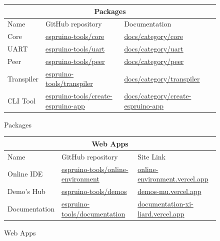 \documentclass{l4proj}
\begin{document}
\begin{figure}[!ht]
    
\begin{center}
\begin{tabular}{|p{2.25cm}|p{5.25cm}|p{5.25cm}|}
 \hline
 \multicolumn{3}{|c|}{Packages} \\
 \hline
 Name  & GitHub repository& Documentation\\
 \hline
Core & \href{https://github.com/espruino-tools/core}{espruino-tools/core}  & \href{https://documentation-xi-liard.vercel.app/docs/category/core}{docs/category/core}  \\

UART & \href{https://github.com/espruino-tools/uart}{espruino-tools/uart}  & \href{https://documentation-xi-liard.vercel.app/docs/category/uart}{docs/category/uart}  \\

Peer & \href{https://github.com/espruino-tools/peer}{espruino-tools/peer}  & \href{https://documentation-xi-liard.vercel.app/docs/category/peer}{docs/category/peer}  \\

Transpiler & \href{https://github.com/espruino-tools/transpiler}{espruino-tools/transpiler}  & \href{https://documentation-xi-liard.vercel.app/docs/category/transpiler}{docs/category/transpiler}  \\

CLI Tool &  \href{https://github.com/espruino-tools/create-espruino-app}{espruino-tools/create-espruino-app}  & \href{https://documentation-xi-liard.vercel.app/docs/category/create-espruino-app}{docs/category/create-espruino-app}  \\
 \hline
\end{tabular}
\end{center} 
    \caption{Packages}
    \label{fig:packages}
\end{figure}

\begin{figure}[!ht]
\begin{center}
\begin{tabular}{|p{2.25cm}|p{5.25cm}|p{5.25cm}|}
\hline
\multicolumn{3}{|c|}{Web Apps} \\
 \hline
 Name & GitHub repository & Site Link\\
 \hline
Online IDE & \href{https://github.com/espruino-tools/online-environment}{espruino-tools/online-environment} & \href{https://online-environment.vercel.app/}{online-environment.vercel.app} \\
Demo's Hub & \href{https://github.com/espruino-tools/demos}{espruino-tools/demos}  & \href{https://demos-mu.vercel.app/}{demos-mu.vercel.app} \\
Documentation & \href{https://github.com/espruino-tools/documentation}{espruino-tools/documentation} & \href{https://documentation-xi-liard.vercel.app/}{documentation-xi-liard.vercel.app} \\
 \hline
\end{tabular}
\end{center}
\caption{Web Apps}
\label{fig:webapps}
\end{figure}
\end{document}
